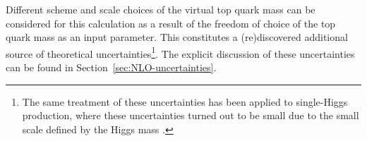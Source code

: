 Different scheme and scale choices of the virtual top quark mass can be considered for this calculation as a result of the freedom of choice of the top quark mass as an input parameter. This constitutes a (re)discovered additional source of theoretical uncertainties\footnote{The same treatment of these uncertainties has been applied to single-Higgs production, where these uncertainties turned out to be small due to the small scale defined by the Higgs mass \cite{Anastasiou:2016cez}.}. The explicit discussion of these uncertainties can be found in Section~\ref{sec:NLO-uncertainties}.
